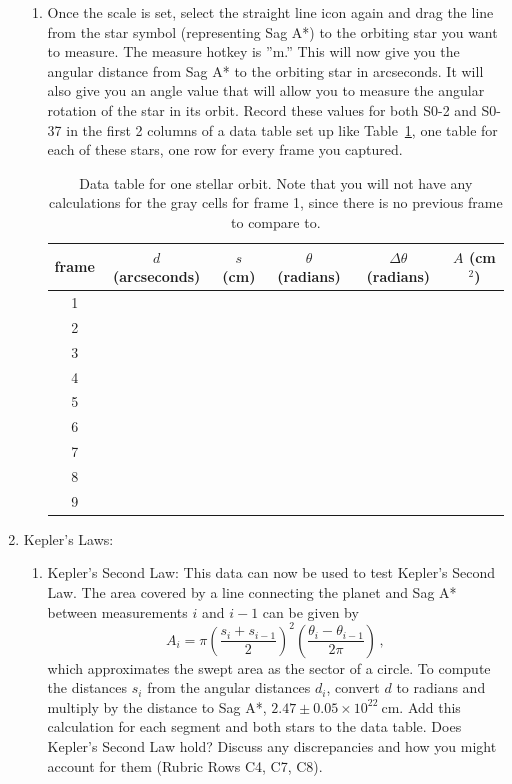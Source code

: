 \begin{enumerate}
\begin{enumerate}
		\item Once the scale is set, select the straight line icon again and drag the line from the star symbol
		(representing Sag A*) to the orbiting star you want to measure. The measure hotkey is ”m.”
		This will now give you the angular distance from Sag A* to the orbiting star in arcseconds.
		It will also give you an angle value that will allow you to measure the angular rotation of
		the star in its orbit. Record these values for both S0-2 and S0-37 in the first 2 columns of a data table set up like Table~\ref{gc:tab:orbits}, one table for each of these stars, one row for every frame you captured.
		
\begin{table}
	\centering
	\begin{tabular}{c|c|c|c|c|c}
		frame & $d$ (arcseconds) & $s$ (cm) & $\theta$ (radians) & $\Delta \theta$ (radians) & $A$ (cm$^2$)
		\\ \midrule
		1 & & & & \cellcolor{black!25} & \cellcolor{black!25}
		\\ \midrule
		2 & & & & & 
		\\ \midrule
		3 & & & &  &
		\\ \midrule
		4 & & & &  &
		\\ \midrule
		5 & & & & &
		\\ \midrule
		6 & & & & &
		\\ \midrule
		7 & & & & &
		\\ \midrule
		8 & & & & &
		\\ \midrule
		9 & & & & &
		\\ \bottomrule
	\end{tabular}
	\caption{Data table for one stellar orbit. Note that you will not have any calculations for the gray cells for frame 1, since there is no previous frame to compare to.}\label{gc:tab:orbits}
\end{table}		

	\end{enumerate}

	\item Kepler's Laws:
	\begin{enumerate}
		\item Kepler's Second Law: This data can now be used to test Kepler’s Second Law. The area
		covered by a line connecting the planet and Sag A* between measurements $i$ and $i - 1$ can
		be given by
		\begin{equation}
		 A_i = \pi \left( \frac{s_{i} + s_{i-1}}{2} \right)^2 \left( \frac{\theta_{i}-\theta_{i-1}}{2\pi} \right) \,,
		\end{equation}
		which approximates the swept area as the sector of a circle. To compute the distances $s_i$ from the angular distances $d_i$, convert $d$ to radians and multiply by the distance to Sag A*, $2.47 \pm 0.05 \times 10^{22}\:$cm.  Add this calculation for each
		segment and both stars to the data table. Does Kepler’s Second Law hold? Discuss any
		discrepancies and how you might account for them (Rubric Rows C4, C7, C8).
		

\end{enumerate}
\end{enumerate}
